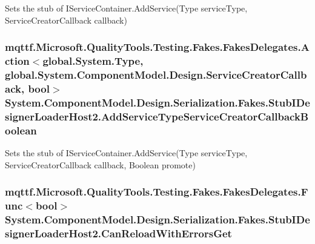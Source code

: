 Sets the stub of I\-Service\-Container.\-Add\-Service(\-Type service\-Type, Service\-Creator\-Callback callback)

\hypertarget{class_system_1_1_component_model_1_1_design_1_1_serialization_1_1_fakes_1_1_stub_i_designer_loader_host2_a23ad488e23ab3585b23751bf69c38015}{
\subsubsection[{Add\-Service\-Type\-Service\-Creator\-Callback\-Boolean}]{\setlength{\rightskip}{0pt plus 5cm}mqttf.\-Microsoft.\-Quality\-Tools.\-Testing.\-Fakes.\-Fakes\-Delegates.\-Action$<$global.\-System.\-Type, global.\-System.\-Component\-Model.\-Design.\-Service\-Creator\-Callback, bool$>$ System.\-Component\-Model.\-Design.\-Serialization.\-Fakes.\-Stub\-I\-Designer\-Loader\-Host2.\-Add\-Service\-Type\-Service\-Creator\-Callback\-Boolean}}\label{class_system_1_1_component_model_1_1_design_1_1_serialization_1_1_fakes_1_1_stub_i_designer_loader_host2_a23ad488e23ab3585b23751bf69c38015}


Sets the stub of I\-Service\-Container.\-Add\-Service(\-Type service\-Type, Service\-Creator\-Callback callback, Boolean promote)

\hypertarget{class_system_1_1_component_model_1_1_design_1_1_serialization_1_1_fakes_1_1_stub_i_designer_loader_host2_a8f4e5016b53365f42b72bf7b14bf31de}{
\subsubsection[{Can\-Reload\-With\-Errors\-Get}]{\setlength{\rightskip}{0pt plus 5cm}mqttf.\-Microsoft.\-Quality\-Tools.\-Testing.\-Fakes.\-Fakes\-Delegates.\-Func$<$bool$>$ System.\-Component\-Model.\-Design.\-Serialization.\-Fakes.\-Stub\-I\-Designer\-Loader\-Host2.\-Can\-Reload\-With\-Errors\-Get}}\label{class_system_1_1_component_model_1_1_design_1_1_serialization_1_1_fakes_1_1_stub_i_designer_loader_host2_a8f4e5016b53365f42b72bf7b14bf31de}


